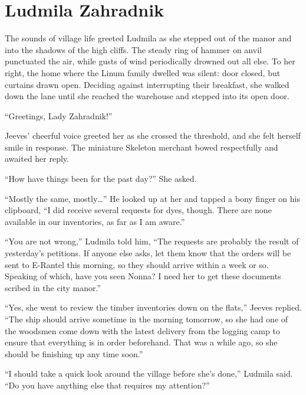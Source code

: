 \chapter{Ludmila Zahradnik}

The sounds of village life greeted Ludmila as she stepped out of the manor and into the shadows of the high cliffs. The steady ring of hammer on anvil punctuated the air, while gusts of wind periodically drowned out all else. To her right, the home where the Linum family dwelled was silent: door closed, but curtains drawn open. Deciding against interrupting their breakfast, she walked down the lane until she reached the warehouse and stepped into its open door.

 

“Greetings, Lady Zahradnik!”

 

Jeeves’ cheerful voice greeted her as she crossed the threshold, and she felt herself smile in response. The miniature Skeleton merchant bowed respectfully and awaited her reply.

 

“How have things been for the past day?” She asked.

 

“Mostly the same, mostly…” He looked up at her and tapped a bony finger on his clipboard, “I did receive several requests for dyes, though. There are none available in our inventories, as far as I am aware.”

 

“You are not wrong,” Ludmila told him, “The requests are probably the result of yesterday’s petitions. If anyone else asks, let them know that the orders will be sent to E-Rantel this morning, so they should arrive within a week or so. Speaking of which, have you seen Nonna? I need her to get these documents scribed in the city manor.”

 

“Yes, she went to review the timber inventories down on the flats,” Jeeves replied. “The ship should arrive sometime in the morning tomorrow, so she had one of the woodsmen come down with the latest delivery from the logging camp to ensure that everything is in order beforehand. That was a while ago, so she should be finishing up any time soon.”

 

“I should take a quick look around the village before she’s done,” Ludmila said. “Do you have anything else that requires my attention?”

